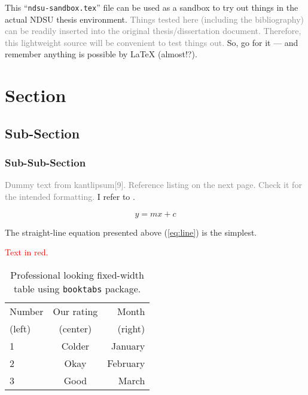 
\checkBeginRefsection%

This ``\texttt{ndsu-sandbox.tex}'' file can be used as a sandbox to try out things in the actual NDSU thesis environment. \textcolor{gray}{Things tested here (including the bibliography) can be readily inserted into the original thesis/dissertation document. Therefore, this lightweight source will be convenient to test things out.} So, go for it --- and remember anything is possible by \LaTeX{} (almost!?).

\section{Section}
\subsection{Sub-Section}
\subsubsection{Sub-Sub-Section}

\textcolor{gray}{Dummy text from kantlipsum[9]. Reference listing on the next page. Check it for the intended formatting.} I refer to \citep{lamport94,kopka2004guide,baczkowski1990ndsu}. 

\begin{equation}
y = mx + c
\label{eq:line}
\end{equation}

The straight-line equation presented above (\cref{eq:line}) is the simplest.

\kant[9]

\textcolor{red}{Text in red.}


\begin{table}[ht]
\centering
\caption{Professional looking fixed-width table using 
\texttt{booktabs} package.}
\begin{tabular}{ l c r }
\toprule
Number & Our rating & Month \\
(left) & (center)   & (right)\\
\midrule
1 & Colder & January \\
2 & Okay   & February \\
3 & Good   & March\\
\bottomrule
\end{tabular}
\label{tab22}
\end{table}

